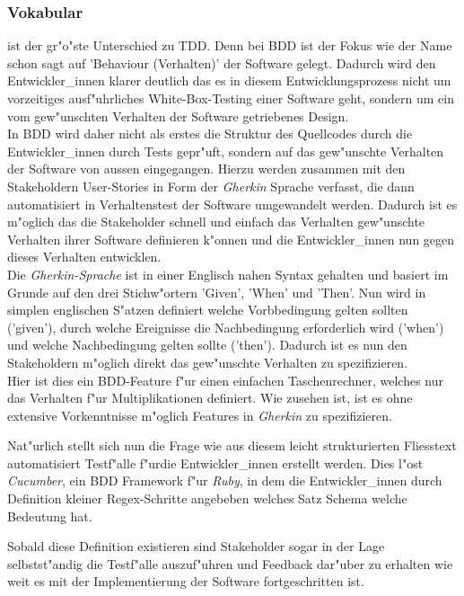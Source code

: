     \subsubsection{Vokabular}
      ist der gr"o"ste Unterschied zu TDD. Denn bei BDD
      ist der Fokus wie der Name schon sagt auf 'Behaviour (Verhalten)' der 
      Software gelegt. Dadurch wird den Entwickler\_innen klarer deutlich
      das es in diesem Entwicklungsprozess nicht um vorzeitiges ausf"uhrliches
      White-Box-Testing einer Software geht, sondern um ein vom gew"unschten 
      Verhalten der Software getriebenes Design.\\
      In BDD wird daher nicht als erstes die Struktur des Quellcodes durch die 
      Entwickler\_innen durch Tests gepr"uft, sondern auf das gew"unschte
      Verhalten der Software von aussen eingegangen. Hierzu werden zusammen
      mit den Stakeholdern User-Stories in Form der {\em Gherkin}\cite{Gherkin} Sprache verfasst, die
      dann automatisiert in Verhaltenstest der Software umgewandelt werden.
      Dadurch ist es m"oglich das die Stakeholder schnell und einfach das 
      Verhalten gew"unschte Verhalten ihrer Software definieren k"onnen und
      die Entwickler\_innen nun gegen dieses Verhalten entwicklen.\\
      Die {\em Gherkin-Sprache} ist in einer Englisch nahen Syntax 
      gehalten und basiert im Grunde auf den drei Stichw"ortern 'Given', 'When' 
      und 'Then'. Nun wird in simplen englischen S"atzen definiert welche 
      Vorbbedingung gelten sollten ('given'), durch welche Ereignisse die 
      Nachbedingung erforderlich wird ('when') und welche Nachbedingung gelten
      sollte ('then'). Dadurch ist es nun den Stakeholdern m"oglich direkt 
      das gew"unschte Verhalten zu spezifizieren.\\
      Hier ist dies ein BDD-Feature f"ur einen einfachen Taschenrechner, welches
      nur das Verhalten f"ur Multiplikationen definiert. Wie zusehen ist, ist 
      es ohne extensive Vorkenntnisse m"oglich Features in {\em Gherkin} zu spezifizieren.
      
      Nat"urlich stellt sich nun die Frage wie aus diesem leicht strukturierten
      Fliesstext automatisiert Testf"alle f"urdie Entwickler\_innen erstellt werden.
      Dies l"ost {\em Cucumber}\cite{Cucumber}, ein BDD Framework f"ur {\em Ruby}, in dem die Entwickler\_innen durch Definition kleiner Regex-Schritte angebeben 
      welches Satz Schema welche Bedeutung hat.
      
      Sobald diese Definition existieren sind Stakeholder sogar in der Lage
      selbstst"andig die Testf"alle auszuf"uhren und Feedback dar"uber zu 
      erhalten wie weit es mit der Implementierung der Software fortgeschritten
      ist.\\\\

